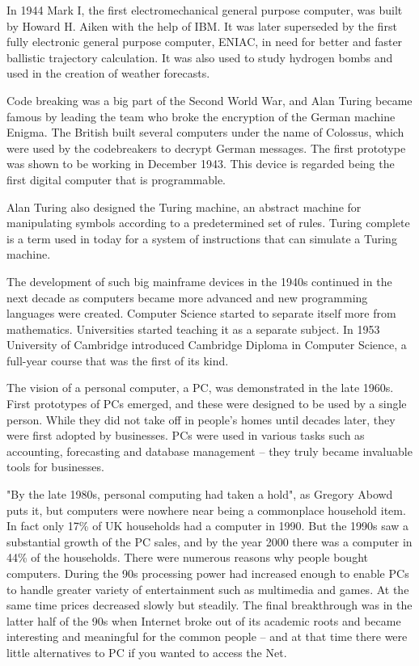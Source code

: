 \documentclass[a4paper,12pt]{article}
\begin{document}
In 1944 Mark I, the first electromechanical general purpose computer, was built by Howard H. Aiken with the help of IBM. It was later superseded by the first fully electronic general purpose computer, ENIAC, in need for better and faster ballistic trajectory calculation. It was also used to study hydrogen bombs and used in the creation of weather forecasts.

Code breaking was a big part of the Second World War, and Alan Turing became famous by leading the team who broke the encryption of the German machine Enigma. The British built several computers under the name of Colossus, which were used by the codebreakers to decrypt German messages. The first prototype was shown to be working in December 1943. This device is regarded being the first digital computer that is programmable.

Alan Turing also designed the Turing machine, an abstract machine for manipulating symbols according to a predetermined set of rules. Turing complete is a term used in today for a system of instructions that can simulate a Turing machine.\cite{witm}

The development of such big mainframe devices in the 1940s continued in the next decade as computers became more advanced and new programming languages were created. Computer Science started to separate itself more from mathematics. Universities started teaching it as a separate subject. In 1953 University of Cambridge introduced Cambridge Diploma in Computer Science, a full-year course that was the first of its kind.

The vision of a personal computer, a PC, was demonstrated in the late 1960s. First prototypes of PCs emerged, and these were designed to be used by a single person. While they did not take off in people's homes until decades later, they were first adopted by businesses. PCs were used in various tasks such as accounting, forecasting and database management -- they truly became invaluable tools for businesses.

"By the late 1980s, personal computing had taken a hold", as Gregory Abowd puts it\cite{gda}, but computers were nowhere near being a commonplace household item. In fact only 17\% of UK households had a computer in 1990. But the 1990s saw a substantial growth of the PC sales, and by the year 2000 there was a computer in 44\% of the households.\cite{stat} There were numerous reasons why people bought computers. During the 90s processing power had increased enough to enable PCs to handle greater variety of entertainment such as multimedia and games. At the same time prices decreased slowly but steadily. The final breakthrough was in the latter half of the 90s when Internet broke out of its academic roots and became interesting and meaningful for the common people -- and at that time there were little alternatives to PC if you wanted to access the Net.
\end{document}
